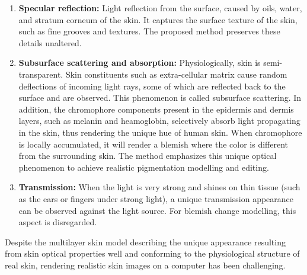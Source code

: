 \begin{spacing}{1.5}
\begin{enumerate}
    \item \textbf{Specular reflection:} Light reflection from the surface, caused by oils, water, and stratum corneum of the skin. It captures the surface texture of the skin, such as fine grooves and textures. The proposed method preserves these details unaltered.
    \item \textbf{Subsurface scattering and absorption:} Physiologically, skin is semi-transparent\cite{Igarashi2005TheAO}. Skin constituents such as extra-cellular matrix cause random deflections of incoming light rays, some of which are reflected back to the surface and are observed. This phenomenon is called subsurface scattering. In addition, the chromophore components present in the epidermis and dermis layers, such as melanin and heamoglobin, selectively absorb light propagating in the skin, thus rendering the unique hue of human skin. When chromophore is locally accumulated, it will render a blemish where the color is different from the surrounding skin\cite{ANDERSON198113}. The method emphasizes this unique optical phenomenon to achieve realistic pigmentation modelling and editing.
    \item \textbf{Transmission:} When the light is very strong and shines on thin tissue (such as the ears or fingers under strong light), a unique transmission appearance can be observed against the light source. For blemish change modelling, this aspect is disregarded.
\end{enumerate}

Despite the multilayer skin model describing the unique appearance resulting from skin optical properties well and conforming to the physiological structure of real skin, rendering realistic skin images on a computer has been challenging. 


\end{spacing}
